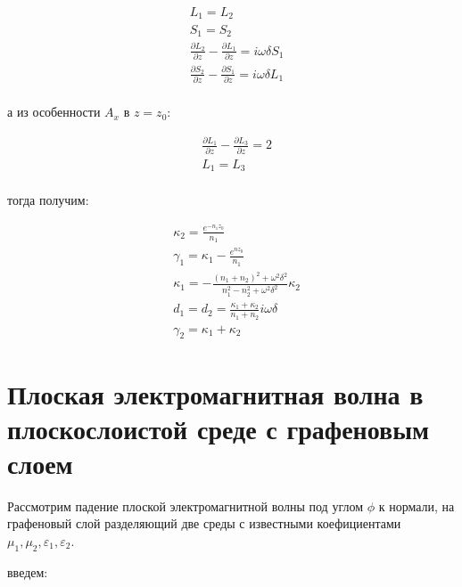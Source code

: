 	\begin{equation}
		\begin{aligned}
			&L_1 = L_2 \\
			&S_1 = S_2 \\
			&\frac{\partial L_2}{\partial z} - \frac{\partial L_1}{\partial z} = i \omega \delta S_1 \\
			&\frac{\partial S_2}{\partial z} - \frac{\partial S_1}{\partial z} = i \omega \delta L_1 \\
		\end{aligned}
	\end{equation}
	
	а из особенности $A_x$ в $z = z_0$:
	
	\begin{equation}
		\begin{aligned}
			&\frac{\partial L_1}{\partial z} - \frac{\partial L_3}{\partial z} = 2 \\
			&L_1 = L_3 \\
		\end{aligned}
	\end{equation}
	
	тогда получим:
	
	\begin{equation}
		\begin{aligned}
			&\kappa_2 = \frac{e^{-n_1 z_0}}{n_1} \\
			&\gamma_1 = \kappa_1 - \frac{e^{n z_0}}{n_1} \\
			&\kappa_1 = - \frac{{(n_1 + n_2)}^2 + \omega^2 \delta^2}{n_1^2 - n_2^2 + \omega^2 \delta^2} \kappa_2 \\
			&d_1 = d_2 = \frac{\kappa_1 + \kappa_2}{n_1 + n_2} i \omega \delta \\
			&\gamma_2 = \kappa_1 + \kappa_2
		\end{aligned}
	\end{equation}
	
	
	\newpage
	
	\section{Плоская электромагнитная волна в плоскослоистой среде с графеновым слоем}
	
	Рассмотрим падение плоской электромагнитной волны под углом $\phi$ к нормали, на графеновый слой разделяющий две среды с известными коефициентами $\mu_1, \mu_2, \varepsilon_1, \varepsilon_2$.
	
	введем:
	

